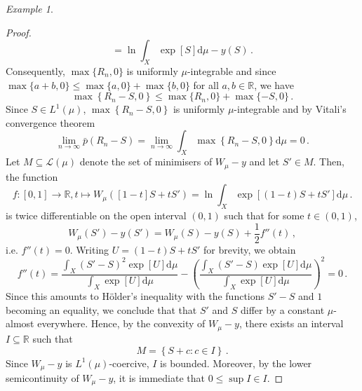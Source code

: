 \documentclass[
	paper=A4,
	pagesize=auto,
	fontsize=12pt
]{scrartcl}
\theoremstyle{plain}
\theoremstyle{remark}
\newtheorem{example}[theorem]{Example}
\theoremstyle{definition}
\begin{document}
\begin{example}
\begin{proof}
\begin{equation}
=
\ln \int_X \exp \left[ S \right] \mathrm{d} \mu - y \left( S \right) \, .
\end{equation}
%
Consequently, $\max\{ R_n, 0 \}$ is uniformly $\mu$-integrable and since $\max\{ a + b, 0 \} \le \max\{ a, 0 \} + \max\{ b, 0 \}$ for all $a, b \in \mathbb{R}$, we have
%
\begin{equation}
\max \left\{ R_n - S, 0 \right\}
\le
\max\{ R_n, 0 \}
+
\max\{ -S, 0 \} \, .
\end{equation}
%
Since $S \in L^1(\mu)$, $\max \left\{ R_n - S, 0 \right\}$ is uniformly $\mu$-integrable and by Vitali's convergence theorem
%
\begin{equation}
\lim_{n \to \infty} \bar{p} \left( R_n - S \right)
=
\lim_{n \to \infty} \int_X \max \left\{ R_n - S, 0 \right\} \mathrm{d} \mu
=
0 \, .
\end{equation}
%
Let $M \subseteq \mathcal{L}(\mu)$ denote the set of minimisers of $W_\mu - y$ and let $S' \in M$.
Then, the function
%
\begin{equation}
f : [0,1] \to \mathbb{R}, t \mapsto W_\mu \left( \left[ 1 - t \right] S + t S' \right)
=
\ln \int_X \exp \left[ \left( 1 - t \right) S + t S' \right] \mathrm{d} \mu \, .
\end{equation}
%
is twice differentiable on the open interval $(0,1)$ such that for some $t \in (0,1)$,
%
\begin{equation}
W_\mu \left( S' \right) - y \left( S' \right)
=
W_\mu \left( S \right) - y \left( S \right)
+
\frac{1}{2} f'' \left( t \right) \, ,
\end{equation}
%
i.e. $f'' ( t ) = 0$.
Writing $U = (1 - t) S + t S'$ for brevity, we obtain
%
\begin{equation}
f'' \left( t \right)
=
\frac{\int_X \left( S' - S \right)^2 \exp \left[ U \right] \mathrm{d} \mu}{\int_X \exp \left[ U \right] \mathrm{d} \mu}
- \left( \frac{\int_X \left( S' - S \right) \exp \left[ U \right] \mathrm{d} \mu}{\int_X \exp \left[ U \right] \mathrm{d} \mu} \right)^2
=
0 \, .
\end{equation}
%
Since this amounts to Hölder's inequality with the functions $S' - S$ and $1$ becoming an equality, we conclude that that $S'$ and $S$ differ by a constant $\mu$-almost everywhere.
Hence, by the convexity of $W_\mu - y$, there exists an interval $I \subseteq \mathbb{R}$ such that
%
\begin{equation}
M = \left\{ S + c : c \in I \right\} \, .
\end{equation}
%
Since $W_\mu - y$ is $L^1(\mu)$-coercive, $I$ is bounded.
Moreover, by the lower semicontinuity of $W_\mu - y$, it is immediate that $0 \le \sup I \in I$.

\end{proof}
\end{example}
\end{document}
